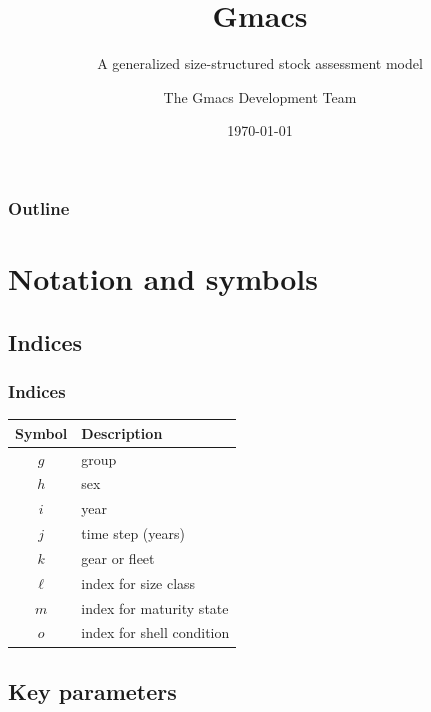 \documentclass{beamer}
\title{Gmacs}
\subtitle{A generalized size-structured stock assessment model}
\author{The Gmacs Development Team}
\date{\today}
\begin{document}

\begin{frame}
\titlepage
\end{frame}


\begin{frame}
\frametitle{Outline}
\tableofcontents
\end{frame}


\section{Notation and symbols}
\subsection{Indices}

\begin{frame}
\frametitle{Indices}

\begin{table}
  \centering
  \begin{tabular}{cl}
  \hline
  Symbol  & Description \\
  \hline
      $g$ & group \\
      $h$ & sex \\
      $i$ & year \\
      $j$ & time step (years) \\
      $k$ & gear or fleet \\
      $\ell$ & index for size class \\
      $m$ & index for maturity state \\
      $o$ & index for shell condition \\
  \hline
  \end{tabular}
\end{table}

\end{frame}


\subsection{Key parameters}
\end{document}
